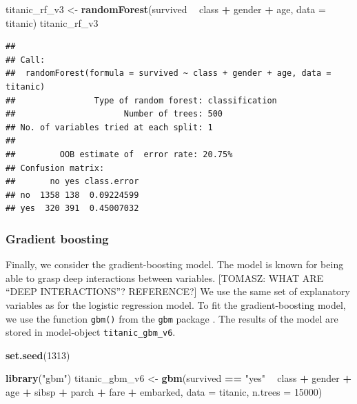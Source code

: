 \documentclass[12pt,]{krantz}
\newenvironment{Shaded}{\begin{snugshade}}{\end{snugshade}}
\newcommand{\DataTypeTok}[1]{\textcolor[rgb]{0.13,0.29,0.53}{#1}}
\newcommand{\DecValTok}[1]{\textcolor[rgb]{0.00,0.00,0.81}{#1}}
\newcommand{\KeywordTok}[1]{\textcolor[rgb]{0.13,0.29,0.53}{\textbf{#1}}}
\newcommand{\NormalTok}[1]{#1}
\newcommand{\OperatorTok}[1]{\textcolor[rgb]{0.81,0.36,0.00}{\textbf{#1}}}
\newcommand{\StringTok}[1]{\textcolor[rgb]{0.31,0.60,0.02}{#1}}
\theoremstyle{definition}
\theoremstyle{definition}
\theoremstyle{definition}
\theoremstyle{remark}
\begin{document}
\begin{Shaded}
\begin{Highlighting}[]
\NormalTok{titanic_rf_v3 <-}\StringTok{ }\KeywordTok{randomForest}\NormalTok{(survived }\OperatorTok{~}\StringTok{ }\NormalTok{class }\OperatorTok{+}\StringTok{ }\NormalTok{gender }\OperatorTok{+}\StringTok{ }\NormalTok{age, }\DataTypeTok{data =}\NormalTok{ titanic)}
\NormalTok{titanic_rf_v3}
\end{Highlighting}
\end{Shaded}

\begin{verbatim}
## 
## Call:
##  randomForest(formula = survived ~ class + gender + age, data = titanic) 
##                Type of random forest: classification
##                      Number of trees: 500
## No. of variables tried at each split: 1
## 
##         OOB estimate of  error rate: 20.75%
## Confusion matrix:
##       no yes class.error
## no  1358 138  0.09224599
## yes  320 391  0.45007032
\end{verbatim}

\hypertarget{gradient-boosting}{%
\subsubsection{Gradient boosting}\label{gradient-boosting}}

Finally, we consider the gradient-boosting model. The model is known for
being able to grasp deep interactions between variables. {[}TOMASZ: WHAT
ARE ``DEEP INTERACTIONS''? REFERENCE?{]} We use the same set of
explanatory variables as for the logistic regression model. To fit the
gradient-boosting model, we use the function \texttt{gbm()} from the
\texttt{gbm} package \citep{gbm}. The results of the model are stored in
model-object \texttt{titanic\_gbm\_v6}.

\begin{Shaded}
\begin{Highlighting}[]
\KeywordTok{set.seed}\NormalTok{(}\DecValTok{1313}\NormalTok{)}

\KeywordTok{library}\NormalTok{(}\StringTok{"gbm"}\NormalTok{)}
\NormalTok{titanic_gbm_v6 <-}\StringTok{ }\KeywordTok{gbm}\NormalTok{(survived }\OperatorTok{==}\StringTok{ "yes"} \OperatorTok{~}\StringTok{ }\NormalTok{class }\OperatorTok{+}\StringTok{ }\NormalTok{gender }\OperatorTok{+}\StringTok{ }\NormalTok{age }\OperatorTok{+}\StringTok{ }\NormalTok{sibsp }\OperatorTok{+}\StringTok{ }\NormalTok{parch }\OperatorTok{+}\StringTok{ }\NormalTok{fare }\OperatorTok{+}\StringTok{ }\NormalTok{embarked, }
                      \DataTypeTok{data =}\NormalTok{ titanic, }\DataTypeTok{n.trees =} \DecValTok{15000}\NormalTok{)}
\end{Highlighting}
\end{Shaded}
\end{document}

